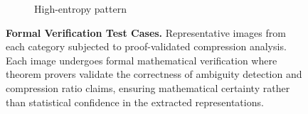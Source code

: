 \begin{figure}[htbp]
\begin{subfigure}{0.45\textwidth}
\caption{High-entropy pattern}
\end{subfigure}
\caption{\textbf{Formal Verification Test Cases.} Representative images from each category subjected to proof-validated compression analysis. Each image undergoes formal mathematical verification where theorem provers validate the correctness of ambiguity detection and compression ratio claims, ensuring mathematical certainty rather than statistical confidence in the extracted representations.}
\label{fig:proof-validation-cases}
\end{figure}

